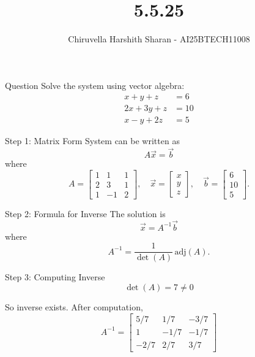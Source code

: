 \documentclass{beamer}
\title{5.5.25}
\author{Chiruvella Harshith Sharan - AI25BTECH11008}
\begin{document}
\frame{\titlepage}


\begin{frame}{Question}
Solve the system using vector algebra:
\[
\begin{aligned}
x + y + z &= 6 \\
2x + 3y + z &= 10 \\
x - y + 2z &= 5
\end{aligned}
\]
\end{frame}


\begin{frame}{Step 1: Matrix Form}
System can be written as
\[
A\vec{x} = \vec{b} \tag{1}
\]
where
\[
A = \begin{bmatrix}
1 & 1 & 1 \\
2 & 3 & 1 \\
1 & -1 & 2
\end{bmatrix}, 
\quad
\vec{x} = \begin{bmatrix} x \\ y \\ z \end{bmatrix}, 
\quad
\vec{b} = \begin{bmatrix} 6 \\ 10 \\ 5 \end{bmatrix}.
\]
\end{frame}


\begin{frame}{Step 2: Formula for Inverse}
The solution is
\[
\vec{x} = A^{-1}\vec{b} \tag{2}
\]
where
\[
A^{-1} = \frac{1}{\det(A)} \, \text{adj}(A).
\]
\end{frame}


\begin{frame}{Step 3: Computing Inverse}
\[
\det(A) = 7 \neq 0
\]

So inverse exists. After computation,
\[
A^{-1} =
\begin{bmatrix}
5/7 & 1/7 & -3/7 \\
1 & -1/7 & -1/7 \\
-2/7 & 2/7 & 3/7
\end{bmatrix} \tag{3}
\]
\end{frame}

\end{document}
